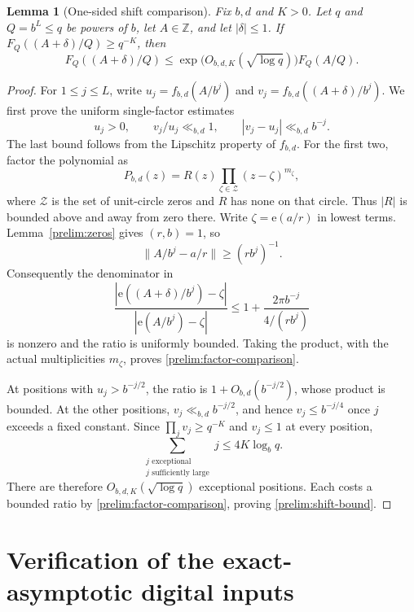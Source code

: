\documentclass[11pt,a4paper]{article}
\theoremstyle{paperplain}
\newtheorem{lemma}[theorem]{Lemma}
\numberwithin{equation}{section}
\begin{document}
\begin{lemma}[One-sided shift comparison]\label{prelim:shift}
Fix $b,d$ and $K>0$. Let $q$ and $Q=b^L\leqslant q$ be powers of $b$,
let $A\in\mathbb Z$, and let $|\delta|\leqslant1$. If
$F_Q((A+\delta)/Q)\geqslant q^{-K}$, then
\begin{equation}\label{prelim:shift-bound}
 F_Q((A+\delta)/Q)
 \leqslant \exp\!\bigl(O_{b,d,K}(\sqrt{\log q})\bigr)F_Q(A/Q).
\end{equation}
\end{lemma}
\begin{proof}
For $1\leqslant j\leqslant L$, write
$u_j=f_{b,d}(A/b^j)$ and $v_j=f_{b,d}((A+\delta)/b^j)$.
We first prove the uniform single-factor estimates
\begin{equation}\label{prelim:factor-comparison}
 u_j>0,\qquad v_j/u_j\ll_{b,d}1,\qquad |v_j-u_j|\ll_{b,d}b^{-j}.
\end{equation}
The last bound follows from the Lipschitz property of $f_{b,d}$.
For the first two, factor the polynomial as
\[
 P_{b,d}(z)=R(z)\prod_{\zeta\in\mathcal Z}(z-\zeta)^{m_\zeta},
\]
where $\mathcal Z$ is the set of unit-circle zeros and $R$ has none
on that circle. Thus $|R|$ is bounded above and away from zero there.
Write $\zeta=\mathrm e(a/r)$ in lowest terms. Lemma~\ref{prelim:zeros}
gives $(r,b)=1$, so
\[
 \|A/b^j-a/r\|\geqslant (rb^j)^{-1}.
\]
Consequently the denominator in
\[
 \frac{|\mathrm e((A+\delta)/b^j)-\zeta|}
      {|\mathrm e(A/b^j)-\zeta|}
 \leqslant
 1+\frac{2\pi b^{-j}}{4/(rb^j)}
\]
is nonzero and the ratio is uniformly bounded. Taking the product,
with the actual multiplicities $m_\zeta$, proves
\eqref{prelim:factor-comparison}.

At positions with $u_j>b^{-j/2}$, the ratio is
$1+O_{b,d}(b^{-j/2})$, whose product is bounded. At the other positions,
$v_j\ll_{b,d}b^{-j/2}$, and hence $v_j\leqslant b^{-j/4}$ once $j$
exceeds a fixed constant. Since $\prod_jv_j\geqslant q^{-K}$ and
$v_j\leqslant1$ at every position,
\[
 \sum_{\substack{j\text{ exceptional}\\j\text{ sufficiently large}}}
 j\leqslant4K\log_bq.
\]
There are therefore $O_{b,d,K}(\sqrt{\log q})$ exceptional positions.
Each costs a bounded ratio by \eqref{prelim:factor-comparison}, proving
\eqref{prelim:shift-bound}.
\end{proof}


\section{Verification of the exact-asymptotic digital inputs}
\label{app:exact-inputs}\label{sec:eleven}
\end{document}
